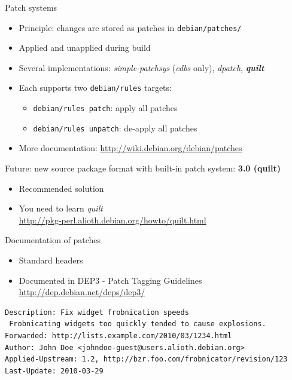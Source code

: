 \documentclass[10pt,final]{beamer}
\begin{document}
\begin{frame}{Patch systems}
  \begin{itemize}
  \item Principle: changes are stored as patches in \texttt{debian/patches/}
    \hbr
  \item Applied and unapplied during build
    \hbr
  \item Several implementations: \textsl{simple-patchsys} (\textsl{cdbs} only),
    \textsl{dpatch}, \textbf{\textsl{quilt}} \hbr
  \item Each supports two \texttt{debian/rules} targets:
    \begin{itemize}
    \item \texttt{debian/rules patch}: apply all patches
    \item \texttt{debian/rules unpatch}: de-apply all patches
    \end{itemize}
    \hbr
  \item More documentation: \url{http://wiki.debian.org/debian/patches}
  \end{itemize}
  \br
  Future: new source package format with built-in patch system: \textbf{3.0 (quilt)}
  \begin{itemize}
  \item Recommended solution
  \item You need to learn \textsl{quilt}\\
    \url{http://pkg-perl.alioth.debian.org/howto/quilt.html}
    
  \end{itemize}
\end{frame}

\begin{frame}[fragile]{Documentation of patches}
  \begin{itemize}
  \item Standard headers
    \hbr
  \item Documented in DEP3 - Patch Tagging Guidelines\\
    \url{http://dep.debian.net/deps/dep3/}
  \end{itemize}
  \begin{lstlisting}[basicstyle=\ttfamily\footnotesize]
Description: Fix widget frobnication speeds
 Frobnicating widgets too quickly tended to cause explosions.
Forwarded: http://lists.example.com/2010/03/1234.html
Author: John Doe <johndoe-guest@users.alioth.debian.org>
Applied-Upstream: 1.2, http://bzr.foo.com/frobnicator/revision/123
Last-Update: 2010-03-29
\end{lstlisting}
\end{frame}
\end{document}
